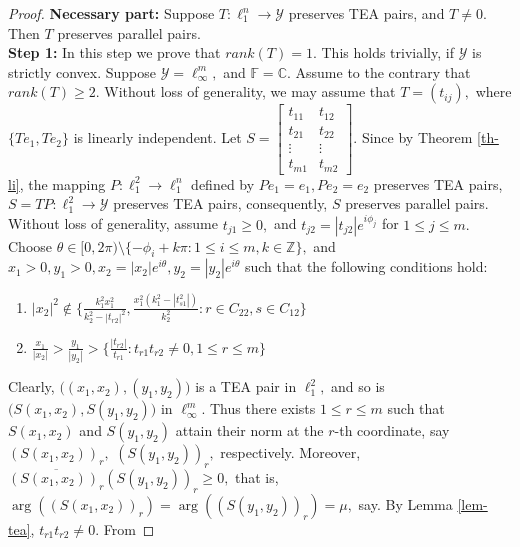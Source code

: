 \documentclass{amsart}
\theoremstyle{definition}
\theoremstyle{remark}
\numberwithin{equation}{section}
\begin{document}
\begin{proof}
\textbf{Necessary part:} Suppose $T:\ell_1^n\to\mathcal{Y}$ preserves TEA pairs, and $T\neq 0.$ Then $T$  preserves parallel pairs.\\
\textbf{Step 1:} In this step we prove that $rank(T)=1.$ This holds trivially, if $\mathcal{Y}$ is strictly convex. Suppose $\mathcal{Y}=\ell_\infty^m,$ and $\mathbb{F}=\mathbb{C}.$	 Assume to the contrary that $rank(T)\geq 2.$ Without loss of generality, we may assume that  $T=(t_{ij}),$ where $\{Te_1,Te_2\}$ is linearly independent. Let $S=\begin{bmatrix}
	t_{11}&t_{12}\\
	t_{21}&t_{22}\\
	\vdots &\vdots\\
	t_{m1}&t_{m2}
\end{bmatrix}.$ 	%
Since by Theorem \ref{th-li}, the mapping $P:\ell_1^2\to \ell_1^n$ defined by %
$Pe_1=e_1,Pe_2=e_2$ preserves TEA pairs, $S=TP:\ell_1^2\to \mathcal{Y}$ preserves TEA pairs, consequently, $S$ preserves parallel pairs. Without loss of generality, assume $t_{j1}\geq 0,$ and $t_{j2}=|t_{j2}|e^{i\phi_j}$ for $1\leq j\leq m.$ Choose $\theta\in [0,2\pi)\setminus\{-\phi_i+k\pi:1\leq i\leq m,k\in \mathbb{Z}\},$ and $x_1>0,y_1>0, x_2=|x_2|e^{i\theta}, y_2=|y_2|e^{i\theta}$ such that the following conditions hold:
\begin{enumerate}
	\item $|x_2|^2\notin \Big\{\frac{k_1^2x_1^2}{k_2^2-|t_{r2}|^2}, \frac{x_1^2(k_1^2-|t_{s1}^2|)}{k_2^2}:r\in C_{22},s\in C_{12}\Big\}$
	\item $\frac{x_1}{|x_2|}>\frac{y_1}{|y_2|}>\Big\{\frac{|t_{r2}|}{t_{r1}}:t_{r1}t_{r2}\neq 0,1\leq r\leq m\Big\}$
	\end{enumerate} Clearly, $\Big((x_1,x_2),(y_1,y_2)\Big)$ is a TEA pair in $\ell_1^2,$ and so is $\Big(S(x_1,x_2),S(y_1,y_2)\Big)$  in $\ell_\infty^m.$ %
Thus there exists $1\leq r\leq m$ such that $S(x_1,x_2)$ and $S(y_1,y_2)$ attain their norm at the $r$-th coordinate, say $(S(x_1,x_2))_r, $ $(S(y_1,y_2))_r,$ respectively. Moreover,  $\overline{(S(x_1,x_2))_r}(S(y_1,y_2))_r\geq 0,$ that is, $\arg((S(x_1,x_2))_r)=\arg((S(y_1,y_2))_r)=\mu,$ say. By Lemma \ref{lem-tea}, $t_{r1}t_{r2}\neq 0.$ From 

\end{proof}
\end{document}
